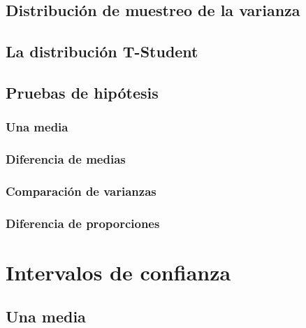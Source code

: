 \documentclass[
]{book}
\begin{document}
\hypertarget{distribuciuxf3n-de-muestreo-de-la-varianza}{%
\section{Distribución de muestreo de la varianza}\label{distribuciuxf3n-de-muestreo-de-la-varianza}}

\hypertarget{la-distribuciuxf3n-t-student}{%
\section{La distribución T-Student}\label{la-distribuciuxf3n-t-student}}

\hypertarget{prueba}{%
\section{Pruebas de hipótesis}\label{prueba}}

\hypertarget{una-media}{%
\subsection{Una media}\label{una-media}}

\hypertarget{diferencia-de-medias}{%
\subsection{Diferencia de medias}\label{diferencia-de-medias}}

\hypertarget{comparaciuxf3n-de-varianzas}{%
\subsection{Comparación de varianzas}\label{comparaciuxf3n-de-varianzas}}

\hypertarget{diferencia-de-proporciones}{%
\subsection{Diferencia de proporciones}\label{diferencia-de-proporciones}}

\hypertarget{intervalos-de-confianza}{%
\chapter{Intervalos de confianza}\label{intervalos-de-confianza}}

\hypertarget{una-media-1}{%
\section{Una media}\label{una-media-1}}
\end{document}
